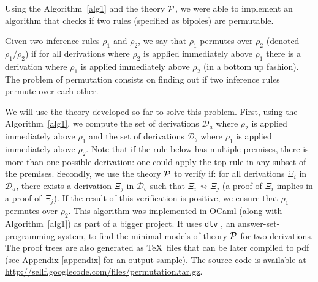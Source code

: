 Using the Algorithm~\ref{alg1} and the theory ${\cal P}$, we were able to implement
an algorithm that checks if two rules (specified as bipoles) are permutable. 

Given two inference rules
$\rho_1$ and $\rho_2$, we say that $\rho_1$ permutes over $\rho_2$ (denoted
$\rho_1 / \rho_2$) if for all
derivations where $\rho_2$ is applied immediately above $\rho_1$ there is a
derivation where $\rho_1$ is applied immediately above $\rho_2$ (in a bottom up
fashion). The problem of
permutation consists on finding out if two inference rules permute over each
other. 

We will use the theory developed so far to solve this problem. First, using the
Algorithm~\ref{alg1}, we compute the set of derivations $\mathcal{D}_a$ where
$\rho_2$ is applied immediately above $\rho_1$ and the set of derivations
$\mathcal{D}_b$ where $\rho_1$ is applied immediately above $\rho_2$. Note that
if the rule below has multiple premises, there is more than one possible
derivation: one could apply the top rule in any subset of the premises. Secondly, we
use the theory ${\cal P}$ to verify if: for all derivations $\Xi_i$ in $\mathcal{D}_a$,
there exists a derivation $\Xi_j$ in $\mathcal{D}_b$ such that $\Xi_i
\rightsquigarrow \Xi_j$ (a proof of $\Xi_i$ implies in a proof of $\Xi_j$). If
the result of this verification is positive, we ensure that $\rho_1$ permutes
over $\rho_2$. This algorithm was implemented in OCaml (along with
Algorithm~\ref{alg1}) as part of a bigger project.
It uses \texttt{dlv} \cite{leone06tcl}, an answer-set-programming system, to
find the minimal models of theory
${\cal P}$ for two derivations. The proof trees are also generated as \TeX\ files
that can be later compiled to pdf (see Appendix \ref{appendix} for an output
sample). The source code is available at
\url{http://sellf.googlecode.com/files/permutation.tar.gz}. 




